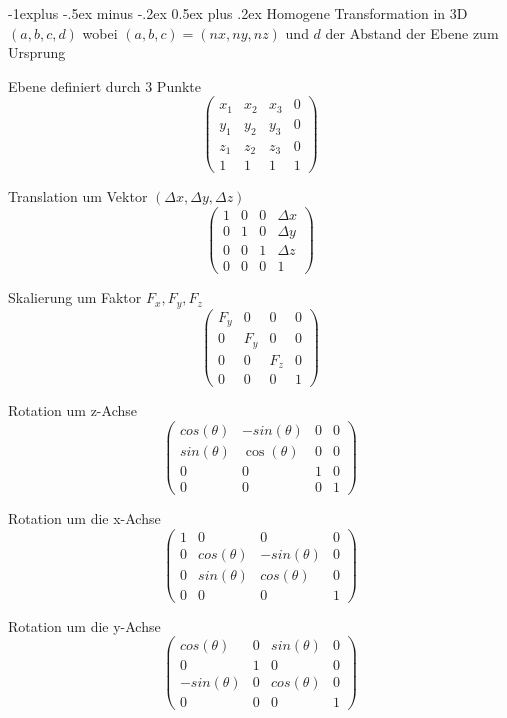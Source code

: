 \documentclass[landscape]{article}
\makeatletter
\renewcommand{\subsection}{\@startsection{subsection}{2}{0mm}%
                                {-1explus -.5ex minus -.2ex}%
                                {0.5ex plus .2ex}%
                                {\normalfont\normalsize\bfseries}}
\makeatother
\begin{document}
\begin{multicols}{3}
  \subsection{ Homogene Transformation in 3D}
  $(a,b,c,d)$ wobei $(a,b,c)=(nx,ny,nz)$ und $d$ der Abstand der Ebene zum Ursprung
  \begin{itemize*}
    \item Ebene definiert durch 3 Punkte
    $$\begin{pmatrix}
        x_1 & x_2 & x_3 & 0 \\
        y_1 & y_2 & y_3 & 0 \\ 
        z_1 & z_2 & z_3 & 0 \\
        1   & 1   & 1   & 1
      \end{pmatrix}$$
    \item Translation um Vektor $(\Delta x, \Delta y,\Delta z)$
    $$\begin{pmatrix}
        1 & 0 & 0 & \Delta x \\
        0 & 1 & 0 & \Delta y \\ 
        0 & 0 & 1 & \Delta z \\
        0 & 0 & 0 & 1
      \end{pmatrix}$$
    \item Skalierung um Faktor $F_x,F_y,F_z$
    $$\begin{pmatrix}
        F_y & 0   & 0   & 0 \\
        0   & F_y & 0   & 0 \\ 
        0   & 0   & F_z & 0 \\
        0   & 0   & 0   & 1
      \end{pmatrix}$$
    \item Rotation um z-Achse
    $$\begin{pmatrix}
        cos(\theta) & -sin(\theta) & 0 & 0 \\
        sin(\theta) & \cos(\theta) & 0 & 0 \\ 
        0           & 0            & 1 & 0 \\
        0           & 0            & 0 & 1
      \end{pmatrix}$$
    \item Rotation um die x-Achse
    $$\begin{pmatrix}
        1 & 0           & 0            & 0 \\
        0 & cos(\theta) & -sin(\theta) & 0 \\ 
        0 & sin(\theta) & cos(\theta)  & 0 \\
        0 & 0           & 0            & 1
      \end{pmatrix}$$
    \item Rotation um die y-Achse
    $$\begin{pmatrix}
        cos(\theta)  & 0 & sin(\theta) & 0 \\
        0            & 1 & 0           & 0 \\ 
        -sin(\theta) & 0 & cos(\theta) & 0 \\
        0            & 0 & 0           & 1
      \end{pmatrix}$$
  \end{itemize*}
  

\end{multicols}
\end{document}

